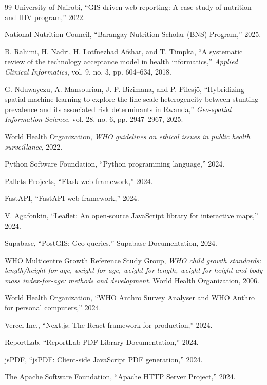 \documentclass[12pt, a4paper]{report}
\begin{document}
\begin{thebibliography}{99}
University of Nairobi, ``GIS driven web reporting: A case study of nutrition and HIV program,'' 2022.

National Nutrition Council, ``Barangay Nutrition Scholar (BNS) Program,'' 2025.

B. Rahimi, H. Nadri, H. Lotfnezhad Afshar, and T. Timpka, ``A systematic review of the technology acceptance model in health informatics,'' \textit{Applied Clinical Informatics}, vol. 9, no. 3, pp. 604--634, 2018.

G. Nduwayezu, A. Mansourian, J. P. Bizimana, and P. Pilesjö, ``Hybridizing spatial machine learning to explore the fine-scale heterogeneity between stunting prevalence and its associated risk determinants in Rwanda,'' \textit{Geo-spatial Information Science}, vol. 28, no. 6, pp. 2947--2967, 2025.

World Health Organization, \textit{WHO guidelines on ethical issues in public health surveillance}, 2022.

Python Software Foundation, ``Python programming language,'' 2024.

Pallets Projects, ``Flask web framework,'' 2024.

FastAPI, ``FastAPI web framework,'' 2024.

V. Agafonkin, ``Leaflet: An open-source JavaScript library for interactive maps,'' 2024.

Supabase, ``PostGIS: Geo queries,'' Supabase Documentation, 2024.

WHO Multicentre Growth Reference Study Group, \textit{WHO child growth standards: length/height-for-age, weight-for-age, weight-for-length, weight-for-height and body mass index-for-age: methods and development}. World Health Organization, 2006.

World Health Organization, ``WHO Anthro Survey Analyser and WHO Anthro for personal computers,'' 2024.

Vercel Inc., ``Next.js: The React framework for production,'' 2024.

ReportLab, ``ReportLab PDF Library Documentation,'' 2024.

jsPDF, ``jsPDF: Client-side JavaScript PDF generation,'' 2024.

The Apache Software Foundation, ``Apache HTTP Server Project,'' 2024.


\end{thebibliography}
\end{document}
